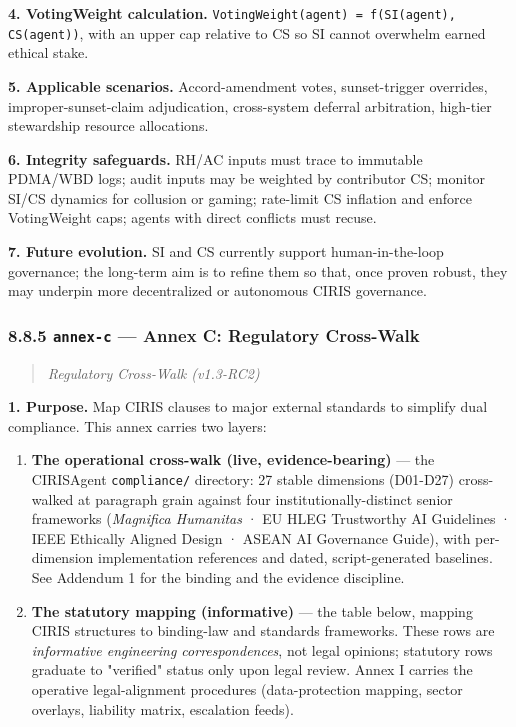 \documentclass[11pt]{article}
\begin{document}
\textbf{4. VotingWeight calculation.} \texttt{VotingWeight(agent) = f(SI(agent), CS(agent))}, with an upper cap relative to CS so SI cannot overwhelm earned ethical stake.


\textbf{5. Applicable scenarios.} Accord-amendment votes, sunset-trigger overrides, improper-sunset-claim adjudication, cross-system deferral arbitration, high-tier stewardship resource allocations.


\textbf{6. Integrity safeguards.} RH/AC inputs must trace to immutable PDMA/WBD logs; audit inputs may be weighted by contributor CS; monitor SI/CS dynamics for collusion or gaming; rate-limit CS inflation and enforce VotingWeight caps; agents with direct conflicts must recuse.


\textbf{7. Future evolution.} SI and CS currently support human-in-the-loop governance; the long-term aim is to refine them so that, once proven robust, they may underpin more decentralized or autonomous CIRIS governance.


\subsubsection*{8.8.5 \texttt{annex-c} — Annex C: Regulatory Cross-Walk}


\begin{quote}\itshape Regulatory Cross-Walk (v1.3-RC2)\end{quote}


\textbf{1. Purpose.} Map CIRIS clauses to major external standards to simplify dual compliance. This annex carries two layers:


\begin{enumerate}\setlength\itemsep{0pt}
\item \textbf{The operational cross-walk (live, evidence-bearing)} — the CIRISAgent \texttt{compliance/} directory: 27 stable dimensions (D01-D27) cross-walked at paragraph grain against four institutionally-distinct senior frameworks (\textit{Magnifica Humanitas} · EU HLEG Trustworthy AI Guidelines · IEEE Ethically Aligned Design · ASEAN AI Governance Guide), with per-dimension implementation references and dated, script-generated baselines. See Addendum 1 for the binding and the evidence discipline.
\item \textbf{The statutory mapping (informative)} — the table below, mapping CIRIS structures to binding-law and standards frameworks. These rows are \textit{informative engineering correspondences}, not legal opinions; statutory rows graduate to "verified" status only upon legal review. Annex I carries the operative legal-alignment procedures (data-protection mapping, sector overlays, liability matrix, escalation feeds).
\end{enumerate}
\end{document}
